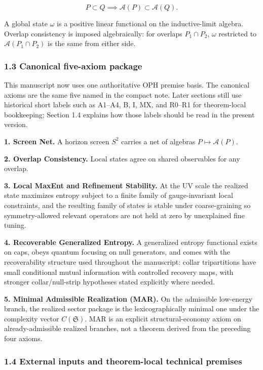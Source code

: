 \[
P \subset Q \implies \mathcal{A}(P) \subset \mathcal{A}(Q).
\]

A global state \(\omega\) is a positive linear functional on the inductive-limit algebra. Overlap consistency is imposed algebraically: for overlaps \(P_1 \cap P_2\), \(\omega\) restricted to \(\mathcal{A}(P_1 \cap P_2)\) is the same from either side.

\subsubsection{1.3 Canonical five-axiom package}\label{13-core-axioms}

This manuscript now uses one authoritative OPH premise basis. The canonical axioms are the same five named in the compact note. Later sections still use historical short labels such as A1--A4, B, I, MX, and R0--R1 for theorem-local bookkeeping; Section 1.4 explains how those labels should be read in the present version.

\textbf{1. Screen Net.} A horizon screen \(S^2\) carries a net of algebras \(P \mapsto \mathcal{A}(P)\).

\textbf{2. Overlap Consistency.} Local states agree on shared observables for any overlap.

\textbf{3. Local MaxEnt and Refinement Stability.} At the UV scale the realized state maximizes entropy subject to a finite family of gauge-invariant local constraints, and the resulting family of states is stable under coarse-graining so symmetry-allowed relevant operators are not held at zero by unexplained fine tuning.

\textbf{4. Recoverable Generalized Entropy.} A generalized entropy functional exists on caps, obeys quantum focusing on null generators, and comes with the recoverability structure used throughout the manuscript: collar tripartitions have small conditional mutual information with controlled recovery maps, with stronger collar/null-strip hypotheses stated explicitly where needed.

\textbf{5. Minimal Admissible Realization (MAR).} On the admissible low-energy branch, the realized sector package is the lexicographically minimal one under the complexity vector \(C(\mathfrak S)\). MAR is an explicit structural-economy axiom on already-admissible realized branches, not a theorem derived from the preceding four axioms.

\subsubsection{1.4 External inputs and theorem-local technical premises}\label{14-assumptions-and-external-inputs}

